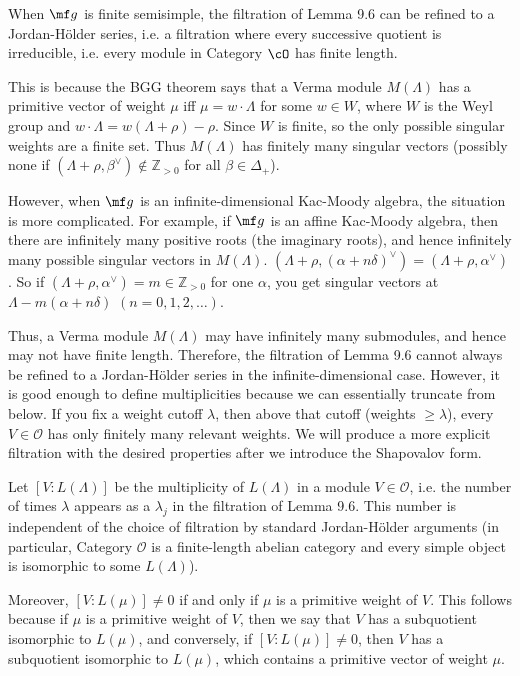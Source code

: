 \documentclass[12pt]{article}
\begin{document}
\begin{remark}
    When $\mf g$ is finite semisimple, the filtration of Lemma 9.6 can be refined to a Jordan-Hölder series, i.e. a filtration where every successive quotient is irreducible, i.e. every module in Category $\cO$ has finite length.

    This is because the BGG theorem says that a Verma module $M(\Lambda)$ has a primitive vector of weight $\mu$ iff $\mu=w\!\cdot\!\Lambda$ for some $w\in W$, where $W$ is the Weyl group and $w\!\cdot\!\Lambda=w(\Lambda+\rho)-\rho$. Since $W$ is finite, so the only possible singular weights are a finite set. Thus $M(\Lambda)$ has finitely many singular vectors (possibly none if $(\Lambda+\rho,\beta^\vee)\notin\mathbb Z_{>0}$ for all $\beta\in\Delta_+$).


    However, when $\mf g$ is an infinite-dimensional Kac-Moody algebra, the situation is more complicated. For example, if $\mf g$ is an affine Kac-Moody algebra, then there are infinitely many positive roots (the imaginary roots), and hence infinitely many possible singular vectors in $M(\Lambda)$. $(\Lambda+\rho,(\alpha+n\delta)^\vee)=(\Lambda+\rho,\alpha^\vee)$. So if $(\Lambda+\rho,\alpha^\vee)=m\in\mathbb{Z}_{>0}$ for one $\alpha$, you get singular vectors at $\Lambda-m(\alpha+n\delta)$ $(n=0,1,2,\dots)$.


    Thus, a Verma module $M(\Lambda)$ may have infinitely many submodules, and hence may not have finite length. Therefore, the filtration of Lemma 9.6 cannot always be refined to a Jordan-Hölder series in the infinite-dimensional case. However, it is good enough to define multiplicities because we can essentially truncate from below. If you fix a weight cutoff $\lambda$, then above that cutoff (weights $\geq \lambda$), every $V\in\mathcal O$ has only finitely many relevant weights. We will produce a more explicit filtration with the desired properties after we introduce the Shapovalov form.
\end{remark}

Let $[V:L(\Lambda)]$ be the multiplicity of $L(\Lambda)$ in a module $V \in \mathcal{O}$, i.e. the number of times $\lambda$ appears as a $\lambda_j$ in the filtration of Lemma 9.6. This number is independent of the choice of filtration by standard Jordan-Hölder arguments (in particular, Category $\mathcal{O}$ is a finite-length abelian category and every simple object is isomorphic to some $L(\Lambda)$).

Moreover, $[V:L(\mu)] \neq 0$ if and only if $\mu$ is a primitive weight of $V$. This follows because if $\mu$ is a primitive weight of $V$, then we say that $V$ has a subquotient isomorphic to $L(\mu)$, and conversely, if $[V:L(\mu)] \neq 0$, then $V$ has a subquotient isomorphic to $L(\mu)$, which contains a primitive vector of weight $\mu$.
\end{document}
